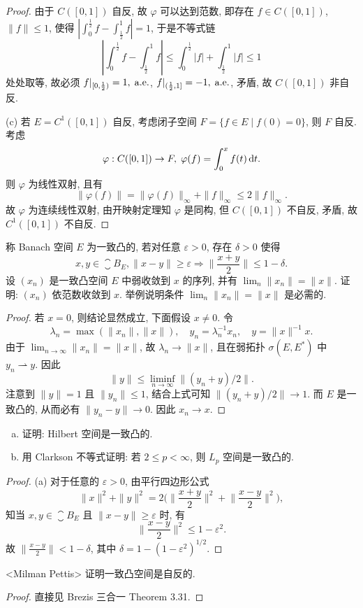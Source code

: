 \begin{proof}
    由于 $C([0,1])$ 自反, 故 $\varphi$ 可以达到范数, 即存在 $f\in C([0,1])$, $\|f\|\leq 1$, 使得
    $|\int_0^{\frac{1}{2}}f-\int_{\frac{1}{2}}^1 f|=1$, 于是不等式链
    \[\left|\int_0^{\frac{1}{2}}f-\int_{\frac{1}{2}}^1f\right|\leq\int_0^{\frac{1}{2}}|f|+\int_{\frac{1}{2}}^1 |f|\leq 1\]
    处处取等, 故必须 $f|_{[0,\frac{1}{2})}=1,\;\mathrm{a.e.}$, $f|_{(\frac{1}{2},1]}=-1,\;\mathrm{a.e.}$,
    矛盾, 故 $C([0,1])$ 非自反.

    (c) 若 $E=C^1([0,1])$ 自反, 考虑闭子空间 $F=\{f\in E\mid f(0)=0\}$, 则 $F$ 自反.
    考虑
    \[\varphi: C([0,1])\to F,\;\varphi(f)=\int_0^x f(t)\mathop{}\!\mathrm{d} t.\]
    则 $\varphi$ 为线性双射, 且有
    \[\|\varphi(f)\|=\|\varphi(f)\|_{\infty}+\|f\|_{\infty}\leq 2\|f\|_{\infty}.\]
    故 $\varphi$ 为连续线性双射, 由开映射定理知 $\varphi$ 是同构, 但 $C([0,1])$ 不自反,
    矛盾, 故 $C^1([0,1])$ 不自反.
\end{proof}


\begin{exercise}[16]
  称 Banach 空间 $E$ 为一致凸的, 若对任意 $\varepsilon>0$, 存在 $\delta>0$ 使得
  \[x,y\in\closure{B}_E, \|x-y\|\geq\varepsilon
    \Longrightarrow\biggl\|\frac{x+y}{2}\biggr\|\leq 1-\delta.\]
  设 $(x_n)$ 是一致凸空间 $E$ 中弱收敛到 $x$ 的序列, 并有 $\lim_n\|x_n\| = \|x\|$.
  证明: $(x_n)$ 依范数收敛到 $x$. 举例说明条件 $\lim_n\|x_n\|=\|x\|$ 是必需的.
\end{exercise}

\begin{proof}
  若 $x = 0$, 则结论显然成立, 下面假设 $x\neq 0$. 令
  \[\lambda_n = \max(\|x_n\|, \|x\|),\quad y_n = \lambda_n^{-1}x_n,
    \quad y = \|x\|^{-1}x.\]
  由于 $\lim_{n\to\infty}\|x_n\| = \|x\|$,
  故 $\lambda_n\to \|x\|$, 且在弱拓扑 $\sigma(E,E^*)$ 中 $y_n\rightharpoonup y$. 因此
  \[\|y\| \leq \liminf_{n\to\infty} \|(y_n+y)/2\|.\]
  注意到 $\|y\|=1$ 且 $\|y_n\|\leq 1$, 结合上式可知 $\|(y_n+y)/2\|\to 1$.
  而 $E$ 是一致凸的, 从而必有 $\|y_n-y\|\to 0$. 因此 $x_n\to x$.
\end{proof}


\begin{exercise}
  \begin{enumerate}[(a)]
    \item 证明: Hilbert 空间是一致凸的.
    \item 用 Clarkson 不等式证明: 若 $2\leq p<\infty$, 则 $L_p$ 空间是一致凸的.
  \end{enumerate}
\end{exercise}

\begin{proof}
  (a) 对于任意的 $\varepsilon>0$, 由平行四边形公式
  \[\|x\|^2 + \|y\|^2 = 2\biggl(\biggl\|\frac{x+y}{2}\biggr\|^2
    + \biggl\|\frac{x-y}{2}\biggr\|^2\biggr),\]
  知当 $x,y\in\closure{B}_E$ 且 $\|x-y\|\geq\varepsilon$ 时, 有
  \[\biggl\|\frac{x-y}{2}\biggr\|^2 \leq 1-\varepsilon^2.\]
  故 $\bigl\|\frac{x-y}{2}\bigr\| < 1-\delta$, 其中 $\delta = 1-(1-\varepsilon^2)^{1/2}$.
\end{proof}


\begin{exercise}<Milman Pettis>
  证明一致凸空间是自反的.
\end{exercise}

\begin{proof}
  直接见 Brezis 三合一 Theorem 3.31.
\end{proof}